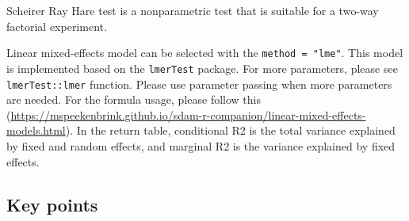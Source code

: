 \documentclass[
]{book}
\newenvironment{Shaded}{\begin{snugshade}}{\end{snugshade}}
\newcommand{\AttributeTok}[1]{\textcolor[rgb]{0.77,0.63,0.00}{#1}}
\newcommand{\CommentTok}[1]{\textcolor[rgb]{0.56,0.35,0.01}{\textit{#1}}}
\newcommand{\ConstantTok}[1]{\textcolor[rgb]{0.00,0.00,0.00}{#1}}
\newcommand{\ControlFlowTok}[1]{\textcolor[rgb]{0.13,0.29,0.53}{\textbf{#1}}}
\newcommand{\FunctionTok}[1]{\textcolor[rgb]{0.00,0.00,0.00}{#1}}
\newcommand{\NormalTok}[1]{#1}
\newcommand{\OtherTok}[1]{\textcolor[rgb]{0.56,0.35,0.01}{#1}}
\newcommand{\SpecialCharTok}[1]{\textcolor[rgb]{0.00,0.00,0.00}{#1}}
\newcommand{\StringTok}[1]{\textcolor[rgb]{0.31,0.60,0.02}{#1}}
\begin{document}
Scheirer Ray Hare test is a nonparametric test that is suitable for a two-way factorial experiment.

\begin{Shaded}
\end{Shaded}

Linear mixed-effects model can be selected with the \texttt{method\ =\ "lme"}.
This model is implemented based on the \texttt{lmerTest} package.
For more parameters, please see \texttt{lmerTest::lmer} function.
Please use parameter passing when more parameters are needed.
For the formula usage, please follow this (\url{https://mspeekenbrink.github.io/sdam-r-companion/linear-mixed-effects-models.html}).
In the return table, conditional R2 is the total variance explained by fixed and random effects,
and marginal R2 is the variance explained by fixed effects.

\begin{Shaded}
\end{Shaded}

\hypertarget{key-points-3}{%
\subsection{Key points}\label{key-points-3}}
\end{document}
